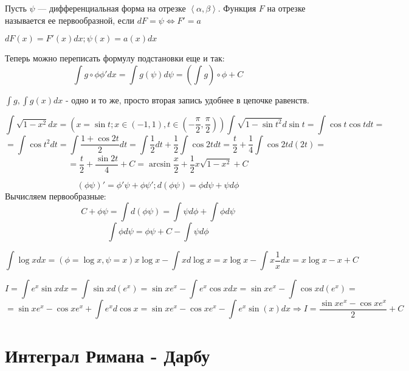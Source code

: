 \documentclass[12pt]{report}
\begin{document}
\begin{defn}
Пусть $\psi$ --- дифференциальная форма на отрезке $\left<\alpha, \beta\right>$. Функция $F$ на отрезке называется ее первообразной, если $dF = \psi \Leftrightarrow F' = a$

$dF(x) = F'(x)dx; \psi(x) = a(x)dx$
\end{defn}

Теперь можно переписать формулу подстановки еще и так:
$$\int{g \circ \phi \phi' dx} = \int{g(\psi)d\psi} = \left(\int{g}\right)\circ \phi + C$$

\begin{note}
$\int{g}, \int{g(x)dx}$  - одно и то же, просто вторая запись удобнее в цепочке равенств.
\end{note}

\begin{ex}
$$\int{\sqrt{1 - x^2}dx} = (x = \sin{t}; x \in (-1, 1), t \in (-\frac{\pi}{2}, \frac{\pi}{2}))\int{\sqrt{1 - \sin{t}^2}d\sin{t}} = \int{\cos{t}\cos{t}dt} = $$ 
$$= \int{\cos{t}^2dt} = \int{\frac{1 + \cos{2t}}{2}dt} = \int{\frac{1}{2}dt} + \frac{1}{2}\int{\cos{2t}dt} = \frac{t}{2} + \frac{1}{4}\int{\cos{2t}d(2t)} = $$ 
$$= \frac{t}{2} + \frac{\sin{2t}}{4} + C = \arcsin{\frac{x}{2}} + \frac{1}{2}x\sqrt{1 - x^2} + C$$
\end{ex}

\begin{st}
$$(\phi\psi)' = \phi'\psi + \phi\psi'; d(\phi\psi) = \phi d\psi + \psi d\phi$$
Вычисляем первообразные:
$$C + \phi\psi = \int{d(\phi\psi)} = \int{\psi d\phi} + \int{\phi d\psi}$$
$$\int{\phi d\psi} = \phi \psi + C - \int{\psi d\phi}$$
\end{st}

\begin{ex}
$$\int{\log{x}dx} = (\phi = \log{x}, \psi = x) x\log{x} - \int{x d\log{x}} = x\log{x} - \int{x \frac{1}{x}dx} = x\log{x} - x + C$$

$$I = \int{e^x\sin{x}dx} = \int{\sin{x}d(e^x)} = \sin{x}e^x - \int{e^x}\cos{x}dx = \sin{x}e^x - \int{\cos{x}d(e^x)} = $$ 
$$ = \sin{x}e^x - \cos{x}e^x + \int{e^xd\cos{x}}
= \sin{x}e^x - \cos{x}e^x - \int{e^x\sin(x)dx}
\Rightarrow I = \frac{\sin{x}e^x - \cos{x}e^x }{2} + C$$
\end{ex}

\section{Интеграл Римана - Дарбу}
\end{document}
